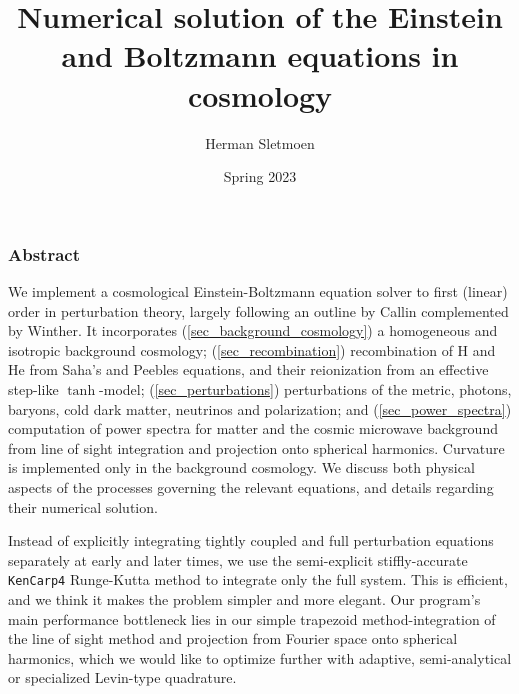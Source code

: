 \documentclass[10pt,a4paper]{article}
\begin{document}
\title{\textbf{Numerical solution of the Einstein and Boltzmann equations in cosmology}} %
\author{Herman Sletmoen}

\date{Spring 2023}

\maketitle

\subsubsection*{\centering Abstract}
	We implement a cosmological Einstein-Boltzmann equation solver to first (linear) order in perturbation theory,
	largely following an outline by Callin complemented by Winther.
	It incorporates
	(\ref{sec_background_cosmology}) a homogeneous and isotropic background cosmology;
	(\ref{sec_recombination}) recombination of H and He from Saha's and Peebles equations, and their reionization from an effective step-like $\tanh$-model;
	(\ref{sec_perturbations}) perturbations of the metric, photons, baryons, cold dark matter, neutrinos and polarization; and
	(\ref{sec_power_spectra}) computation of power spectra for matter and the cosmic microwave background from line of sight integration and projection onto spherical harmonics.
	Curvature is implemented only in the background cosmology.
	We discuss both physical aspects of the processes governing the relevant equations,
	and details regarding their numerical solution.

	Instead of explicitly integrating tightly coupled and full perturbation equations separately at early and later times,
	we use the semi-explicit stiffly-accurate \texttt{KenCarp4} Runge-Kutta method to integrate only the full system.
	This is efficient, and we think it makes the problem simpler and more elegant.
	Our program's main performance bottleneck lies in our simple trapezoid method-integration
	of the line of sight method and projection from Fourier space onto spherical harmonics,
	which we would like to optimize further with adaptive, semi-analytical or specialized Levin-type quadrature.
\end{document}

